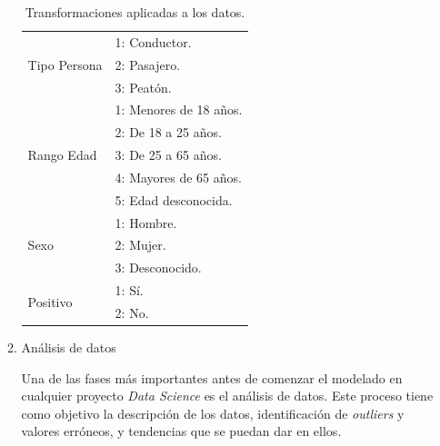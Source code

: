 \begin{enumerate}
\begin{enumerate}
\begin{table}[ht]
\begin{tabular}{ll}
                           \midrule
                           \multirow{3}{*}{Tipo Persona}         & 1: Conductor.\\
                                                                 & 2: Pasajero.\\
                                                                 & 3: Peatón.\\
                           \midrule
                           \multirow{5}{*}{Rango Edad}           & 1: Menores de 18 años.\\
                                                                 & 2: De 18 a 25 años.\\
                                                                 & 3: De 25 a 65 años.\\
                                                                 & 4: Mayores de 65 años.\\
                                                                 & 5: Edad desconocida.\\
                           \midrule
                           \multirow{3}{*}{Sexo}                 & 1: Hombre.\\
                                                                 & 2: Mujer.\\
                                                                 & 3: Desconocido.\\
                           \midrule
                           \multirow{2}{*}{Positivo}             & 1: Sí.\\
                                                                 & 2: No.\\
                           \bottomrule
                      \end{tabular}
                      \caption{Transformaciones aplicadas a los datos.}
                      \label{TransformacionDatosTabla}
                    \end{table}
                    


                \item Análisis de datos

                    Una de las fases más importantes antes de comenzar el modelado en cualquier proyecto \textit{Data Science} es el análisis de datos. Este proceso tiene como objetivo la descripción de los datos, identificación de \textit{outliers} y valores erróneos, y tendencias que se puedan dar en ellos.\\


\end{enumerate}
\end{enumerate}
